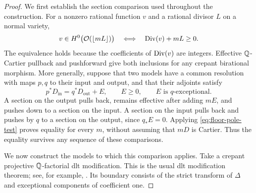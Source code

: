 \begin{proof}
We first establish the section comparison used throughout the
construction. For a nonzero rational function $v$ and a rational
divisor $L$ on a normal variety,
\begin{equation}\label{eq:floor-pole-test}
 v\in H^0\bigl(\mathcal O(\lfloor mL\rfloor)\bigr)
 \quad\Longleftrightarrow\quad
 \operatorname{Div}(v)+mL\geq0.
\end{equation}
The equivalence holds because the coefficients of $\operatorname{Div}(v)$ are
integers. Effective \(\mathbb Q\)-Cartier pullback and pushforward give
both inclusions for any crepant birational morphism. More generally,
suppose that two models have a common resolution with maps $p,q$
to their input and output, and that their adjoints satisfy
\[
 p^*D_{\mathrm{in}}=q^*D_{\mathrm{out}}+E,
 \qquad E\geq0,\qquad E\text{ is }q\text{-exceptional}.
\]
A section on the output pulls back, remains effective after adding
$mE$, and pushes down to a section on the input. A section on the
input pulls back and pushes by $q$ to a section on the output, since
$q_*E=0$. Applying \eqref{eq:floor-pole-test} proves equality for
every $m$, without assuming that $mD$ is Cartier. Thus the equality
survives any sequence of these comparisons.

We now construct the models to which this comparison applies.
Take a crepant projective \(\mathbb Q\)-factorial dlt modification. This is
the usual dlt modification theorem; see, for example,
\cite[Theorem~2.8]{FujinoGongyo2014}. Its boundary consists of the
strict transform of $\Delta$ and exceptional components of coefficient
one.


\end{proof}
